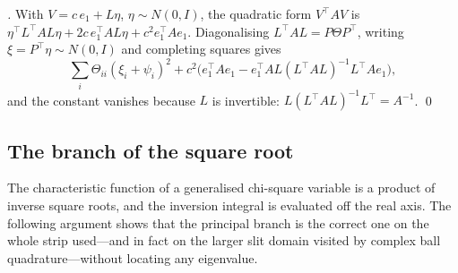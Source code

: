 \emph{.} With $V=c\,e_1+L\eta$, $\eta\sim N(0,I)$, the quadratic form $V^\top AV$ is
$\eta^\top L^\top AL\eta+2c\,e_1^\top AL\eta+c^2e_1^\top Ae_1$. Diagonalising $L^\top AL=P\Theta P^\top$, writing $\xi=P^\top\eta\sim N(0,I)$ and
completing squares gives
\[\sum_i\Theta_{ii}(\xi_i+\psi_i)^2+c^2\big(e_1^\top Ae_1-e_1^\top AL(L^\top AL)^{-1}L^\top Ae_1\big),\]
and the constant vanishes because $L$ is invertible: $L(L^\top AL)^{-1}L^\top=A^{-1}$. \qed

\subsection{The branch of the square root}
The characteristic function of a generalised chi-square variable is a product of inverse square roots, and the inversion
integral is evaluated off the real axis. The following argument shows that the principal branch is the correct one on
the whole strip used---and in fact on the larger slit domain visited by complex ball quadrature---without locating any
eigenvalue.

